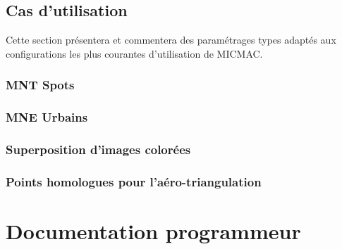 \documentclass[a4paper]{book}
\begin{document}
% 








\chapter{Cas d'utilisation}

Cette section pr\'esentera et commentera des param\'etrages types
adapt\'es aux configurations les plus courantes d'utilisation de
MICMAC.

\section{MNT Spots}
\section{MNE Urbains}
\section{Superposition d'images color\'ees}
\section{Points homologues pour l'a\'ero-triangulation}




\part{Documentation programmeur}
\end{document}
